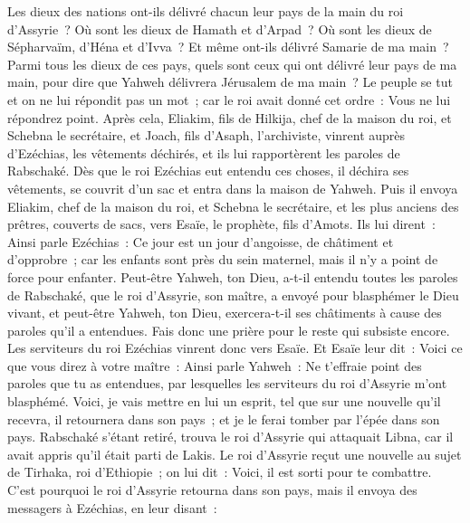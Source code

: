 \begin{multicols}{2}
Les dieux des nations ont-ils délivré chacun leur pays de la main du roi d'Assyrie~?
Où sont les dieux de Hamath et d'Arpad~? Où sont les dieux de Sépharvaïm, d'Héna et d'Ivva~? Et même ont-ils délivré Samarie de ma main~?
Parmi tous les dieux de ces pays, quels sont ceux qui ont délivré leur pays de ma main, pour dire que Yahweh délivrera Jérusalem de ma main~?
Le peuple se tut et on ne lui répondit pas un mot~; car le roi avait donné cet ordre~: Vous ne lui répondrez point.
Après cela, Eliakim, fils de Hilkija, chef de la maison du roi, et Schebna le secrétaire, et Joach, fils d'Asaph, l'archiviste, vinrent auprès d'Ezéchias, les vêtements déchirés, et ils lui rapportèrent les paroles de Rabschaké.
\VerseOne{}Dès que le roi Ezéchias eut entendu ces choses, il déchira ses vêtements, se couvrit d'un sac et entra dans la maison de Yahweh.
Puis il envoya Eliakim, chef de la maison du roi, et Schebna le secrétaire, et les plus anciens des prêtres, couverts de sacs, vers Esaïe, le prophète, fils d'Amots.
Ils lui dirent~: Ainsi parle Ezéchias~: Ce jour est un jour d'angoisse, de châtiment et d'opprobre~; car les enfants sont près du sein maternel, mais il n'y a point de force pour enfanter.
Peut-être Yahweh, ton Dieu, a-t-il entendu toutes les paroles de Rabschaké, que le roi d'Assyrie, son maître, a envoyé pour blasphémer le Dieu vivant, et peut-être Yahweh, ton Dieu, exercera-t-il ses châtiments à cause des paroles qu'il a entendues. Fais donc une prière pour le reste qui subsiste encore.
Les serviteurs du roi Ezéchias vinrent donc vers Esaïe.
Et Esaïe leur dit~: Voici ce que vous direz à votre maître~: Ainsi parle Yahweh~: Ne t'effraie point des paroles que tu as entendues, par lesquelles les serviteurs du roi d'Assyrie m'ont blasphémé.
Voici, je vais mettre en lui un esprit, tel que sur une nouvelle qu'il recevra, il retournera dans son pays~; et je le ferai tomber par l'épée dans son pays.
Rabschaké s'étant retiré, trouva le roi d'Assyrie qui attaquait Libna, car il avait appris qu'il était parti de Lakis.
Le roi d'Assyrie reçut une nouvelle au sujet de Tirhaka, roi d'Ethiopie~; on lui dit~: Voici, il est sorti pour te combattre. C'est pourquoi le roi d'Assyrie retourna dans son pays, mais il envoya des messagers à Ezéchias, en leur disant~:

\end{multicols}
